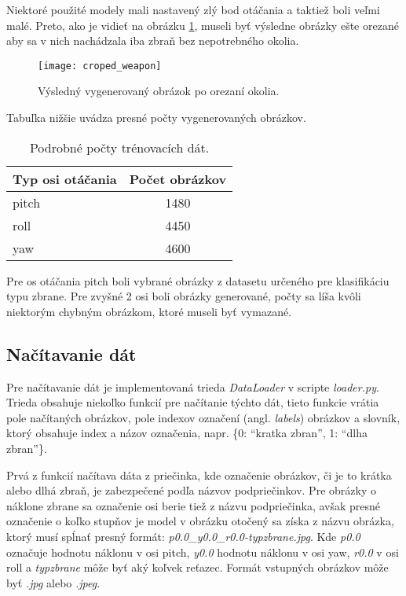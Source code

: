Niektoré použité modely mali nastavený zlý bod otáčania a taktiež boli veľmi malé.
Preto, ako je vidieť na obrázku \ref{pic:generator3d}, museli byť výsledne obrázky ešte orezané aby sa v nich nachádzala iba zbraň bez nepotrebného okolia.

\begin{figure}[H]
    \centering
    \texttt{[image: croped\_weapon]}
    \caption{Výsledný vygenerovaný obrázok po orezaní okolia.}
    \label{pic:generator3d}
\end{figure}

Tabuľka nižšie uvádza presné počty vygenerovaných obrázkov.

\begin{table}[H]
    \centering
    \label{my-label}
    \begin{tabular}{|l|c|}
        \hline
        Typ osi otáčania & \multicolumn{1}{l|}{Počet obrázkov} \\ \hline
        pitch            & 1480                                \\ \hline
        roll             & 4450                                \\ \hline
        yaw              & 4600                                \\ \hline
        \end{tabular}
    \caption{Podrobné počty trénovacích dát.}
\end{table}

Pre os otáčania pitch boli vybrané obrázky z datasetu určeného pre klasifikáciu typu zbrane.
Pre zvyšné 2 osi boli obrázky generované, počty sa líša kvôli niektorým chybným obrázkom, ktoré museli byť vymazané.

\subsection{Načítavanie dát}
\label{subsec:nacitaniedat}
Pre načítavanie dát je implementovaná trieda \textit{DataLoader} v scripte \textit{loader.py}.
Trieda obsahuje niekoľko funkcií pre načítanie týchto dát, tieto funkcie vrátia pole načítaných obrázkov, pole indexov označení (angl. \textit{labels}) obrázkov a
    slovník, ktorý obsahuje index a názov označenia, napr. \{0: ``kratka zbran'', 1: ``dlha zbran''\}.

Prvá z funkcií načítava dáta z priečinka, kde označenie obrázkov, či je to krátka alebo dlhá zbraň, je zabezpečené podľa názvov podpriečinkov.
Pre obrázky o náklone zbrane sa označenie osi berie tiež z názvu podpriečinka, avšak presné označenie o koľko stupňov je model v obrázku otočený
    sa získa z názvu obrázka, ktorý musí spĺnať presný formát: \textit{p0.0\_y0.0\_r0.0-typzbrane.jpg}.
Kde \textit{p0.0} označuje hodnotu náklonu v osi pitch, \textit{y0.0} hodnotu náklonu v osi yaw, \textit{r0.0} v osi roll a \textit{typzbrane} môže byť
    aký koľvek reťazec.
Formát vstupných obrázkov môže byť \textit{.jpg} alebo \textit{.jpeg}.

